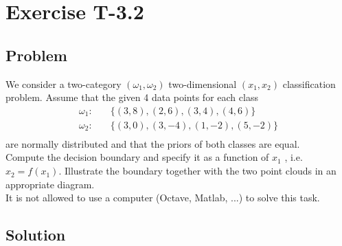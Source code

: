 \section*{Exercise T-3.2}
\subsection*{Problem}
We consider a two-category $(\omega_1 , \omega_2 )$ two-dimensional $(x_1, x_2 )$ classification problem. Assume that the given 4 data points for each class
\begin{align}
\omega_1 :& \quad \{(3,8),(2,6),(3,4),(4,6)\}\nonumber\\ 
\omega_2 :& \quad \{(3,0),(3,-4),(1,-2),(5,-2)\}\nonumber\\ \nonumber
\end{align}
are normally distributed and that the priors of both classes are equal.\\

Compute the decision boundary and specify it as a function of $x_1$ , i.e. $x_2 = f (x_1 )$. Illustrate the boundary together with the two point clouds in an appropriate diagram.\\

It is not allowed to use a computer (Octave, Matlab, ...) to solve this task.

\subsection*{Solution}

